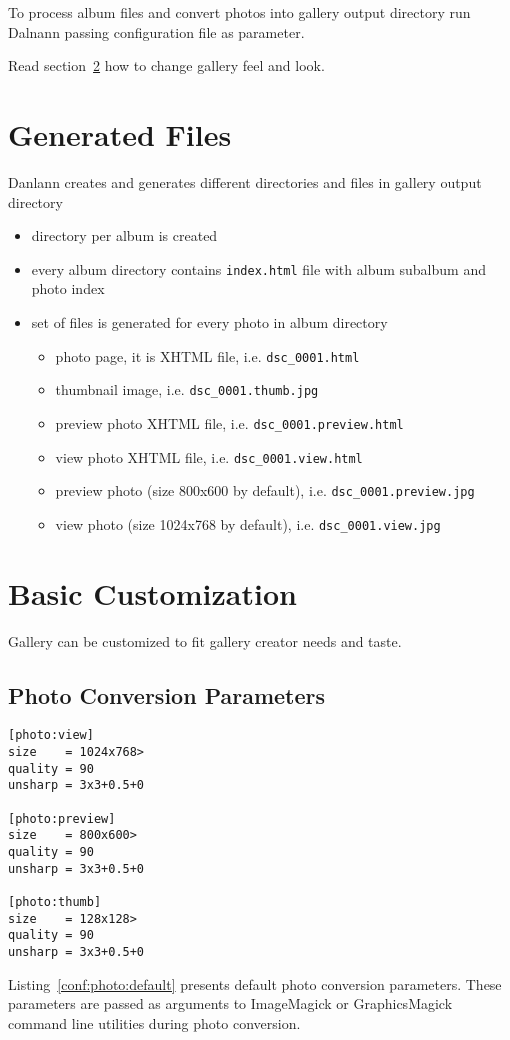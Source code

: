 \documentclass{article}
\begin{document}
To process album files and convert photos into gallery output directory
run Dalnann passing configuration file as parameter.

Read section~\ref{customization} how to change gallery feel and look.

\section{Generated Files}
Danlann creates and generates different directories and files
in gallery output directory
\begin{itemize}
\item directory per album is created
\item every album directory contains \texttt{index.html} file
    with album subalbum and photo index
\item set of files is generated for every photo in album directory
    \begin{itemize}
    \item photo page, it is XHTML file, i.e. \texttt{dsc\_0001.html}
    \item thumbnail image, i.e. \texttt{dsc\_0001.thumb.jpg}
    \item preview photo XHTML file, i.e. \texttt{dsc\_0001.preview.html}
    \item view photo XHTML file, i.e. \texttt{dsc\_0001.view.html}
    \item preview photo (size 800x600 by default),
        i.e. \texttt{dsc\_0001.preview.jpg}
    \item view photo (size 1024x768 by default),
        i.e. \texttt{dsc\_0001.view.jpg}
    \end{itemize}
\end{itemize}

\section{Basic Customization}\label{customization}
Gallery can be customized to fit gallery creator needs and taste.

\subsection{Photo Conversion Parameters}
\begin{listing}
\begin{lstlisting}
[photo:view]
size    = 1024x768>
quality = 90
unsharp = 3x3+0.5+0

[photo:preview]
size    = 800x600>
quality = 90
unsharp = 3x3+0.5+0

[photo:thumb]
size    = 128x128>
quality = 90
unsharp = 3x3+0.5+0
\end{lstlisting}
\caption{Default photo conversion parameters}\label{conf:photo:default}
\end{listing}
Listing~\ref{conf:photo:default} presents default photo conversion
parameters. These parameters are passed as arguments to ImageMagick or GraphicsMagick
command line utilities during photo conversion.
\end{document}
